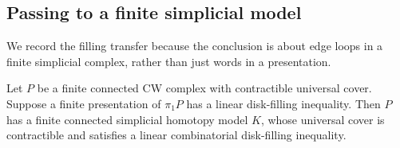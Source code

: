 \subsection{Passing to a finite simplicial model}
We record the filling transfer because the conclusion is about edge loops in a finite simplicial complex, rather than just words in a presentation.

\begin{lemma}\label{lem:completion-transfer}
Let $P$ be a finite connected CW complex with contractible universal cover. Suppose a finite presentation of $\pi_1P$ has a linear disk-filling inequality. Then $P$ has a finite connected simplicial homotopy model $K$, whose universal cover is contractible and satisfies a linear combinatorial disk-filling inequality.
\end{lemma}
